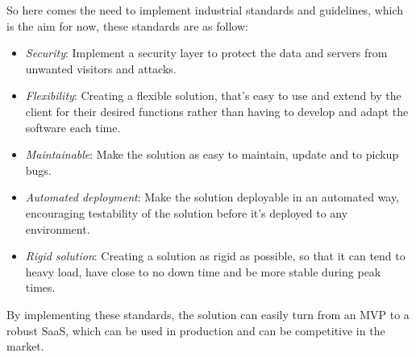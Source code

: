 So here comes the need to implement industrial standards and guidelines, which
is the aim for now, these standards are as follow:
\begin{itemize}
    \item \emph{Security}: Implement a security layer to protect the data
        and servers from unwanted visitors and attacks.
    \item \emph{Flexibility}: Creating a flexible solution, that's easy
        to use and extend by the client for their desired functions rather
        than having to develop and adapt the software each time.
    \item \emph{Maintainable}: Make the solution as easy to maintain,
        update and to pickup bugs.
    \item \emph{Automated deployment}: Make the solution deployable in an
        automated way, encouraging testability of the solution before it's
        deployed to any environment.
    \item \emph{Rigid solution}: Creating a solution as rigid as possible,
        so that it can tend to heavy load, have close to no down time and
        be more stable during peak times.
\end{itemize}

By implementing these standards, the solution can easily turn from an MVP to
a robust SaaS, which can be used in production and can be competitive in
the market.


